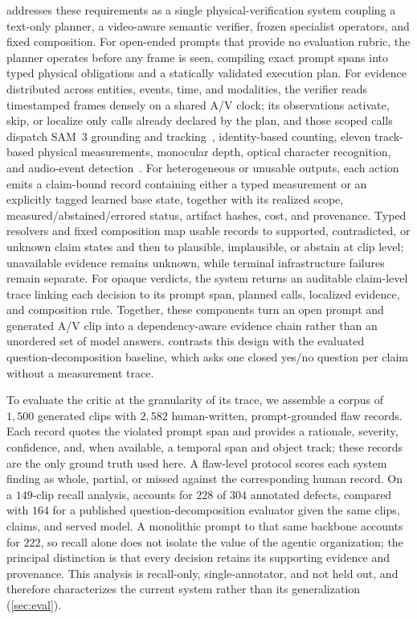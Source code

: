 \PhyReAct{} addresses these requirements as a single physical-verification
system coupling a text-only planner, a video-aware semantic verifier, frozen
specialist operators, and fixed composition. For open-ended prompts that provide
no evaluation rubric, the planner operates before any frame is seen, compiling
exact prompt spans into typed physical obligations and a statically validated
execution plan. For evidence distributed across entities, events, time, and
modalities, the verifier reads timestamped frames densely on a shared A/V clock;
its observations activate, skip, or localize only calls already declared by the
plan, and those scoped calls dispatch SAM~3 grounding and
tracking~\cite{sam3_2025}, identity-based counting, eleven track-based physical
measurements, monocular depth, optical character recognition, and audio-event
detection~\cite{flexsed2025}. For heterogeneous or unusable outputs, each action
emits a claim-bound record containing either a typed measurement or an explicitly
tagged learned base state, together with its realized scope,
measured/abstained/errored status, artifact hashes, cost, and provenance. Typed
resolvers and fixed composition map usable records to supported, contradicted,
or unknown claim states and then to plausible, implausible, or abstain at clip
level; unavailable evidence remains unknown, while terminal infrastructure
failures remain separate. For opaque verdicts, the system returns an auditable
claim-level trace linking each decision to its prompt span, planned calls,
localized evidence, and composition rule. Together, these components turn an
open prompt and generated A/V clip into a dependency-aware evidence chain rather
than an unordered set of model answers.  contrasts this design
with the evaluated question-decomposition baseline, which asks one closed
yes/no question per claim without a measurement trace.

To evaluate the critic at the granularity of its trace, we assemble a corpus of
$1{,}500$ generated clips with $2{,}582$ human-written, prompt-grounded flaw
records. Each record quotes the violated prompt span and provides a rationale,
severity, confidence, and, when available, a temporal span and object track;
these records are the only ground truth used here. A flaw-level protocol scores
each system finding as whole, partial, or missed against the corresponding
human record. On a $149$-clip recall analysis, \PhyReAct{} accounts for $228$ of
$304$ annotated defects, compared with $164$ for a published
question-decomposition evaluator given the same clips, claims, and served model.
A monolithic prompt to that same backbone accounts for $222$, so recall alone
does not isolate the value of the agentic organization; the principal
distinction is that every \PhyReAct{} decision retains its supporting evidence
and provenance. This analysis is recall-only, single-annotator, and not held
out, and therefore characterizes the current system rather than its
generalization (\cref{sec:eval}).

